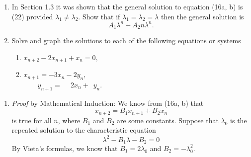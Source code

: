 \begin{homeworkProblem}
    \begin{enumerate}
        \item In Section 1.3 it was shown that the general solution to equation
        (16a, b) is (22) provided $\lambda_1 \neq \lambda_2$. Show that if
        $\lambda_1 = \lambda_2 = \lambda$ then the general solution is
        \[
            A_1\lambda^n + A_2 n \lambda^n.
        \]
        \item Solve and graph the solutions to each of the following equations or
        systems
        \begin{enumerate}[label=(\roman*)]
            \addtocounter{enumii}{1}
            \item $x_{n+2} - 2x_{n+1} + x_n = 0,$
            \item $x_{n+1} = -3 x_n - 2y_n,$\\
            $\qquad y_{n+1} = \phantom{-} 2 x_n +\phantom{2}y_n.$
        \end{enumerate}
    \end{enumerate}
    
    \segline
    
    \solution
    \begin{enumerate}
        \item \textit{Proof} by Mathematical Induction:
        We know from (16a, b) that
        \[
            x_{n+2} = B_1 x_{n+1} + B_2 x_{n}
        \]
        is true for all $n$, where $B_1$ and $B_2$ are some constants.
        Suppose that $\lambda_0$ is the repeated solution to the characteristic
        equation
        \[
            \lambda^2 - B_1 \lambda - B_2 = 0
        \]
        By Vieta's formulas, we know that $B_1 = 2\lambda_0$ and $B_2=-\lambda_0^2$.
    

\end{enumerate}
\end{homeworkProblem}
